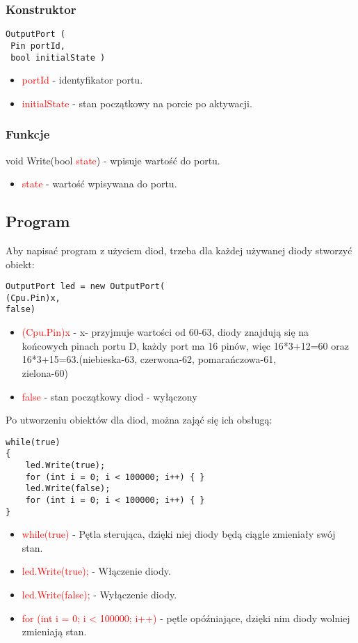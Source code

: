 \documentclass{article}
\begin{document}
\subsubsection{Konstruktor}
\begin{lstlisting}[frame=single] 
 OutputPort (
 Pin portId,
 bool initialState )
\end{lstlisting}
\begin{itemize}
\item \textcolor{red}{portId} - identyfikator portu.
\item \textcolor{red}{initialState} - stan początkowy na porcie po aktywacji.
\end{itemize}
\subsubsection{Funkcje}
void Write(bool \textcolor{red}{state}) - wpisuje wartość do portu.
\begin{itemize}
\item \textcolor{red}{state} - wartość wpisywana do portu.
\end{itemize}
\subsection{Program}
Aby napisać program z użyciem diod, trzeba dla każdej używanej diody stworzyć obiekt:
\begin{lstlisting}[frame=single] 
OutputPort led = new OutputPort(
(Cpu.Pin)x,
false)
\end{lstlisting}
\begin{itemize}
\item \textcolor{red}{(Cpu.Pin)x} - x- przyjmuje wartości od 60-63, diody znajdują się na \newline końcowych pinach portu D, każdy port ma 16 pinów, więc 16*3+12=60 oraz 16*3+15=63.(niebieska-63, czerwona-62, pomarańczowa-61, \\zielona-60)
\item \textcolor{red}{false} - stan początkowy diod - wyłączony
\end{itemize}
Po utworzeniu obiektów dla diod, można zająć się ich obsługą:
\begin{lstlisting}[frame=single] 
while(true)
{
	led.Write(true);
	for (int i = 0; i < 100000; i++) { }
	led.Write(false);
	for (int i = 0; i < 100000; i++) { }
}
\end{lstlisting}
\begin{itemize}
\item \textcolor{red}{while(true)} - Pętla sterująca, dzięki niej diody będą ciągle zmieniały swój stan.
\item \textcolor{red}{led.Write(true);} - Włączenie diody.
\item \textcolor{red}{led.Write(false);} - Wyłączenie diody.
\item \textcolor{red}{for (int i = 0; i < 100000; i++) { }} - pętle opóźniające, dzięki nim diody wolniej zmieniają stan.
\end{itemize}
\end{document}

